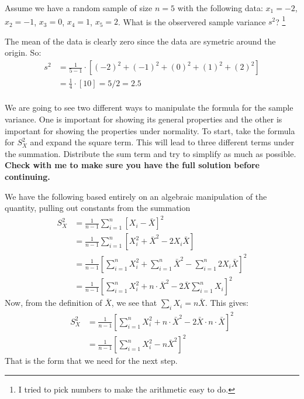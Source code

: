 
Assume we have a random sample of size $n = 5$ with the following data:
$x_1 = -2$, $x_2 = -1$, $x_3 = 0$, $x_4 = 1$, $x_5 = 2$. What is the observered
sample variance $s^2$? 
\footnote{
  I tried to pick numbers to make the arithmetic easy to do. 
}


The mean of the data is clearly zero since the data are symetric around the
origin. So:
\begin{align*}
s^2 &= \frac{1}{5 - 1} \cdot \left[(-2)^2 + (-1)^2 + (0)^2 + (1)^2 + (2)^2 \right] \\
&= \frac{1}{4} \cdot \left[10 \right] = 5/2 = 2.5 \\
\end{align*}


We are going to see two different ways to manipulate the formula for the 
sample variance. One is important for showing its general properties and
the other is important for showing the properties under normality. To start,
take the formula for $S^2_X$ and expand the square term. This will lead to
three different terms under the summation. Distribute the sum term and
try to simplify as much as possible. \textbf{Check with me to make sure
you have the full solution before continuing.}


We have the following based entirely on an algebraic manipulation of the
quantity, pulling out constants from the summation
\begin{align*}
S^2_X &= \frac{1}{n-1} \sum_{i=1}^n \left[X_i - \bar{X} \right]^2 \\
&= \frac{1}{n-1} \sum_{i=1}^n \left[X_i^2 + \bar{X}^2 - 2 X_i \bar{X} \right] \\
&= \frac{1}{n-1} \left[ \sum_{i=1}^n X_i^2 + \sum_{i=1}^n \bar{X}^2 - \sum_{i=1}^n 2 X_i \bar{X} \right]^2 \\
&= \frac{1}{n-1} \left[ \sum_{i=1}^n X_i^2 + n \cdot \bar{X}^2 - 2 \bar{X} \sum_{i=1}^n X_i \right]^2
\end{align*}
Now, from the definition of $\bar{X}$, we see that $\sum_i X_i = n \bar{X}$.
This gives:
\begin{align*}
S^2_X &= \frac{1}{n-1} \left[ \sum_{i=1}^n X_i^2 + n \cdot \bar{X}^2 - 2 \bar{X} \cdot n \cdot \bar{X} \right]^2 \\
&= \frac{1}{n-1} \left[ \sum_{i=1}^n X_i^2 - n \bar{X}^2 \right]^2
\end{align*}
That is the form that we need for the next step.

